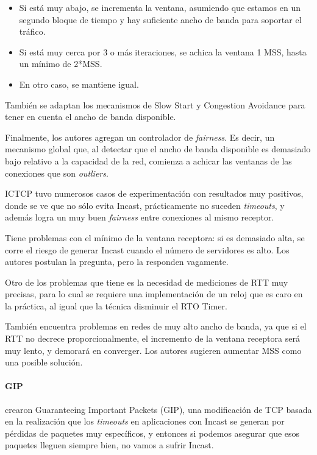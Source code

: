 \documentclass[runningheads,a4paper]{llncs}
\begin{document}
\begin{itemize}
    \item Si está muy abajo, se incrementa la ventana, asumiendo que estamos en un segundo bloque de tiempo y hay suficiente ancho de banda para soportar el tráfico.
    
    \item Si está muy cerca por 3 o más iteraciones, se achica la ventana 1 MSS, hasta un mínimo de 2*MSS.
    
    \item En otro caso, se mantiene igual.
\end{itemize}

También se adaptan los mecanismos de Slow Start y Congestion Avoidance para tener en cuenta el ancho de banda disponible.

Finalmente, los autores agregan un controlador de \textit{fairness}. Es decir, un mecanismo global que, al detectar que el ancho de banda disponible es demasiado bajo relativo a la capacidad de la red, comienza a achicar las ventanas de las conexiones que son \textit{outliers}.

ICTCP tuvo numerosos casos de experimentación con resultados muy positivos, donde se ve que no sólo evita Incast, prácticamente no suceden \textit{timeouts}, y además logra un muy buen \textit{fairness} entre conexiones al mismo receptor. 

Tiene problemas con el mínimo de la ventana receptora: si es demasiado alta, se corre el riesgo de generar Incast cuando el número de servidores es alto. Los autores postulan la pregunta, pero la responden vagamente.

Otro de los problemas que tiene es la necesidad de mediciones de RTT muy precisas, para lo cual se requiere una implementación de un reloj que es caro en la práctica, al igual que la técnica disminuir el RTO Timer. 

También encuentra problemas en redes de muy alto ancho de banda, ya que si el RTT no decrece proporcionalmente, el incremento de la ventana receptora será muy lento, y demorará en converger. Los autores sugieren aumentar MSS como una posible solución.

\paragraph{GIP}

\citet{Zhang_GIP_2013} crearon Guaranteeing Important Packets (GIP), una modificación de TCP basada en la realización que los \textit{timeouts} en aplicaciones con Incast se generan por pérdidas de paquetes muy específicos, y entonces si podemos asegurar que esos paquetes lleguen siempre bien, no vamos a sufrir Incast.
\end{document}
